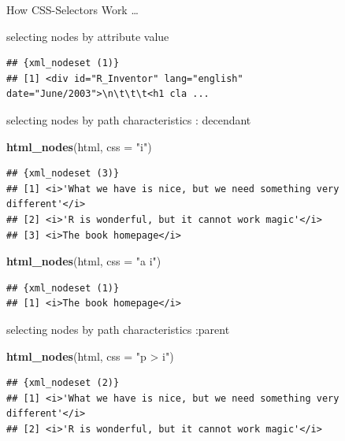 \documentclass[ignorenonframetext,]{beamer}
\newenvironment{Shaded}{\begin{snugshade}}{\end{snugshade}}
\newcommand{\KeywordTok}[1]{\textcolor[rgb]{0.13,0.29,0.53}{\textbf{{#1}}}}
\newcommand{\DataTypeTok}[1]{\textcolor[rgb]{0.13,0.29,0.53}{{#1}}}
\newcommand{\StringTok}[1]{\textcolor[rgb]{0.31,0.60,0.02}{{#1}}}
\newcommand{\NormalTok}[1]{{#1}}
\begin{document}
\begin{frame}[fragile]{How CSS-Selectors Work \ldots{}}
\begin{block}{selecting nodes by attribute value}
\begin{verbatim}
## {xml_nodeset (1)}
## [1] <div id="R_Inventor" lang="english" date="June/2003">\n\t\t\t<h1 cla ...
\end{verbatim}

\end{block}

\begin{block}{selecting nodes by path characteristics : decendant}

\begin{Shaded}
\begin{Highlighting}[]
\KeywordTok{html_nodes}\NormalTok{(html, }\DataTypeTok{css =} \StringTok{"i"}\NormalTok{)}
\end{Highlighting}
\end{Shaded}

\begin{verbatim}
## {xml_nodeset (3)}
## [1] <i>'What we have is nice, but we need something very different'</i>
## [2] <i>'R is wonderful, but it cannot work magic'</i>
## [3] <i>The book homepage</i>
\end{verbatim}

\begin{Shaded}
\begin{Highlighting}[]
\KeywordTok{html_nodes}\NormalTok{(html, }\DataTypeTok{css =} \StringTok{"a i"}\NormalTok{)}
\end{Highlighting}
\end{Shaded}

\begin{verbatim}
## {xml_nodeset (1)}
## [1] <i>The book homepage</i>
\end{verbatim}

\end{block}

\begin{block}{selecting nodes by path characteristics :parent}

\begin{Shaded}
\begin{Highlighting}[]
\KeywordTok{html_nodes}\NormalTok{(html, }\DataTypeTok{css =} \StringTok{"p > i"}\NormalTok{)}
\end{Highlighting}
\end{Shaded}

\begin{verbatim}
## {xml_nodeset (2)}
## [1] <i>'What we have is nice, but we need something very different'</i>
## [2] <i>'R is wonderful, but it cannot work magic'</i>
\end{verbatim}


\end{block}
\end{frame}
\end{document}
